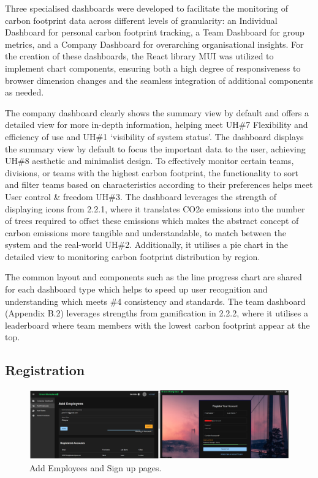 \documentclass{l4proj}
\begin{document}
Three specialised dashboards were developed to facilitate the monitoring of carbon footprint data across different levels of granularity: an Individual Dashboard for personal carbon footprint tracking, a Team Dashboard for group metrics, and a Company Dashboard for overarching organisational insights. For the creation of these dashboards, the React library MUI was utilized to implement chart components, ensuring both a high degree of responsiveness to browser dimension changes and the seamless integration of additional components as needed.

The company dashboard clearly shows the summary view by default and offers a detailed view for more in-depth information, helping meet UH\#7 Flexibility and efficiency of use and UH\#1 ‘visibility of system status’. The dashboard displays the summary view by default to focus the important data to the user, achieving UH\#8 aesthetic and minimalist design. To effectively monitor certain teams, divisions, or teams with the highest carbon footprint, the functionality to sort and filter teams based on characteristics according to their preferences helps meet User control \& freedom UH\#3. The dashboard leverages the strength of displaying icons from 2.2.1, where it translates CO2e emissions into the number of trees required to offset these emissions which makes the abstract concept of carbon emissions more tangible and understandable, to match between the system and the real-world UH\#2. Additionally, it utilises a pie chart in the detailed view to monitoring carbon footprint distribution by region. 

The common layout and components such as the line progress chart are shared for each dashboard type which helps to speed up user recognition and understanding which meets \#4 consistency and standards. The team dashboard (Appendix B.2) leverages strengths from gamification in 2.2.2, where it utilises a leaderboard where team members with the lowest carbon footprint appear at the top.

\subsection{Registration}

\begin{figure}[ht]
  \centering
  \includegraphics[width=\linewidth]{images/registration.png}
  \caption{Add Employees and Sign up pages.}
  \label{fig:registrationpages}
\end{figure}
\end{document}
